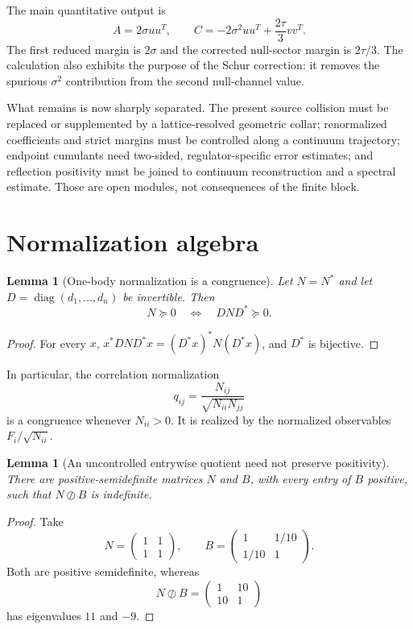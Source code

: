 \documentclass[11pt]{article}
\newtheorem{lemma}[theorem]{Lemma}
\newcommand{\diag}{\operatorname{diag}}
\newcommand{\odiv}{\oslash}
\begin{document}
The main quantitative output is
\[
  A=2\sigma uu^T,
  \qquad
  C=-2\sigma^2uu^T+\frac{2\tau}{3}vv^T.
\]
The first reduced margin is $2\sigma$ and the corrected null-sector margin is $2\tau/3$.  The calculation also exhibits the purpose of the Schur correction: it removes the spurious $\sigma^2$ contribution from the second null-channel value.

What remains is now sharply separated.  The present source collision must be replaced or supplemented by a lattice-resolved geometric collar; renormalized coefficients and strict margins must be controlled along a continuum trajectory; endpoint cumulants need two-sided, regulator-specific error estimates; and reflection positivity must be joined to continuum reconstruction and a spectral estimate.  Those are open modules, not consequences of the finite block.

\appendix

\section{Normalization algebra}
\label{app:normalization}

\begin{lemma}[One-body normalization is a congruence]
Let $N=N^*$ and let $D=\diag(d_1,\ldots,d_n)$ be invertible.  Then
\[
  N\succeq0
  \quad\Longleftrightarrow\quad
  DND^*\succeq0.
\]
\end{lemma}

\begin{proof}
For every $x$, $x^*DND^*x=(D^*x)^*N(D^*x)$, and $D^*$ is bijective.
\end{proof}

In particular, the correlation normalization
\[
  q_{ij}=\frac{N_{ij}}{\sqrt{N_{ii}N_{jj}}}
\]
is a congruence whenever $N_{ii}>0$.  It is realized by the normalized observables $F_i/\sqrt{N_{ii}}$.

\begin{lemma}[An uncontrolled entrywise quotient need not preserve positivity]
There are positive-semidefinite matrices $N$ and $B$, with every entry of $B$ positive, such that $N\odiv B$ is indefinite.
\end{lemma}

\begin{proof}
Take
\[
  N=\begin{pmatrix}1&1\\1&1\end{pmatrix},
  \qquad
  B=\begin{pmatrix}1&1/10\\1/10&1\end{pmatrix}.
\]
Both are positive semidefinite, whereas
\[
  N\odiv B=\begin{pmatrix}1&10\\10&1\end{pmatrix}
\]
has eigenvalues $11$ and $-9$.
\end{proof}
\end{document}
